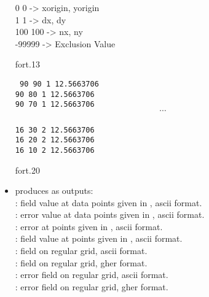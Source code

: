 \begin{itemize}
\begin{exfile}[H]
0  0  -> xorigin, yorigin\\
1  1  -> dx, dy\\
100  100  -> nx, ny\\
-99999  -> Exclusion Value
\caption{fort.13}
\end{exfile}

\begin{exfile}[H]
\tt
90 90 1 12.5663706\\
90 80 1 12.5663706\\
90 70 1 12.5663706\\
$$\cdots$$\\
16 30 2 12.5663706\\
16 20 2 12.5663706\\
16 10 2 12.5663706
\caption{fort.20}
\end{exfile}
	  
  
	  
	  
\item produces as outputs:	\\							
:			field value at data points given in , ascii format.\\					
:			error value at data points given in , ascii format.\\					
:			error at points given in , ascii format.\\					
:			field value at points given in , ascii format.\\					
:			field on regular grid, ascii format.\\					
:			field on regular grid, gher format.\\					
:			error field on regular grid, ascii format.\\					
:			error field on regular grid, gher format.	
 				
\end{itemize}


